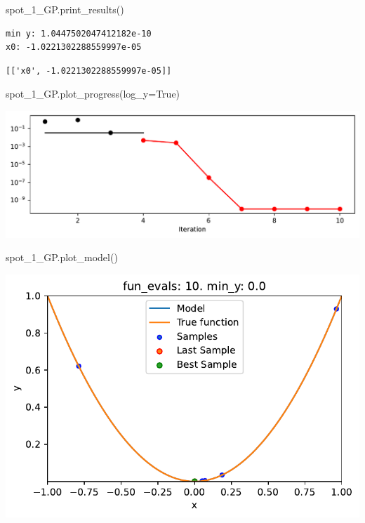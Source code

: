 \documentclass[
  letterpaper,
  DIV=11,
  numbers=noendperiod]{scrreprt}
\newenvironment{Shaded}{\begin{snugshade}}{\end{snugshade}}
\newcommand{\NormalTok}[1]{\textcolor[rgb]{0.00,0.23,0.31}{#1}}
\newcommand{\OperatorTok}[1]{\textcolor[rgb]{0.37,0.37,0.37}{#1}}
\newcommand{\VariableTok}[1]{\textcolor[rgb]{0.07,0.07,0.07}{#1}}
\begin{document}
\begin{Shaded}
\begin{Highlighting}[]
\NormalTok{spot\_1\_GP.print\_results()}
\end{Highlighting}
\end{Shaded}

\begin{verbatim}
min y: 1.0447502047412182e-10
x0: -1.0221302288559997e-05
\end{verbatim}

\begin{verbatim}
[['x0', -1.0221302288559997e-05]]
\end{verbatim}

\begin{Shaded}
\begin{Highlighting}[]
\NormalTok{spot\_1\_GP.plot\_progress(log\_y}\OperatorTok{=}\VariableTok{True}\NormalTok{)}
\end{Highlighting}
\end{Shaded}

\includegraphics{010_num_spot_sklearn_surrogate_files/figure-pdf/cell-26-output-1.pdf}

\begin{Shaded}
\begin{Highlighting}[]
\NormalTok{spot\_1\_GP.plot\_model()}
\end{Highlighting}
\end{Shaded}

\includegraphics{010_num_spot_sklearn_surrogate_files/figure-pdf/cell-27-output-1.pdf}
\end{document}
